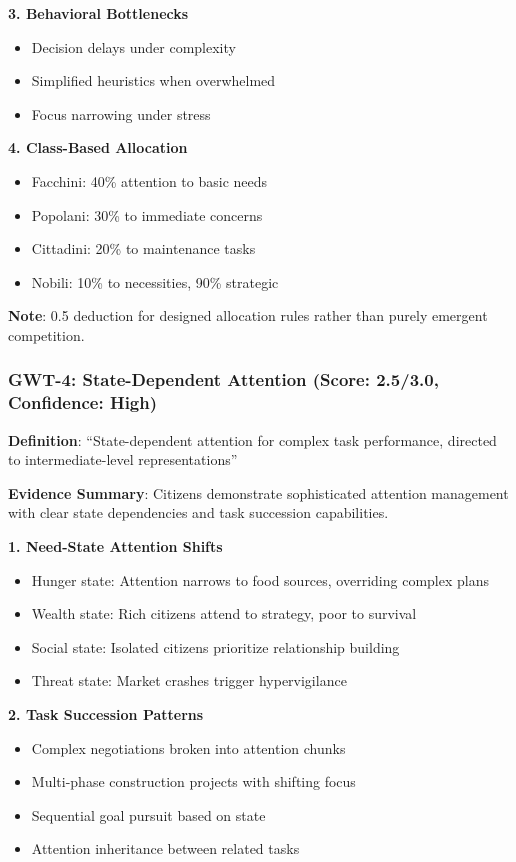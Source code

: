 \documentclass[12pt,a4paper]{article}
\begin{document}
\textbf{3. Behavioral Bottlenecks}
\begin{itemize}
    \item Decision delays under complexity
    \item Simplified heuristics when overwhelmed
    \item Focus narrowing under stress
\end{itemize}

\textbf{4. Class-Based Allocation}
\begin{itemize}
    \item Facchini: 40\% attention to basic needs
    \item Popolani: 30\% to immediate concerns
    \item Cittadini: 20\% to maintenance tasks
    \item Nobili: 10\% to necessities, 90\% strategic
\end{itemize}

\textbf{Note}: 0.5 deduction for designed allocation rules rather than purely emergent competition.

\subsubsection{GWT-4: State-Dependent Attention (Score: 2.5/3.0, Confidence: High)}

\textbf{Definition}: ``State-dependent attention for complex task performance, directed to intermediate-level representations''

\textbf{Evidence Summary}: Citizens demonstrate sophisticated attention management with clear state dependencies and task succession capabilities.

\textbf{1. Need-State Attention Shifts}
\begin{itemize}
    \item Hunger state: Attention narrows to food sources, overriding complex plans
    \item Wealth state: Rich citizens attend to strategy, poor to survival
    \item Social state: Isolated citizens prioritize relationship building
    \item Threat state: Market crashes trigger hypervigilance
\end{itemize}

\textbf{2. Task Succession Patterns}
\begin{itemize}
    \item Complex negotiations broken into attention chunks
    \item Multi-phase construction projects with shifting focus
    \item Sequential goal pursuit based on state
    \item Attention inheritance between related tasks
\end{itemize}
\end{document}
